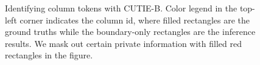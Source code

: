 \documentclass[10pt,twocolumn,letterpaper]{article}
\begin{document}
\begin{figure}
\begin{center}
\end{center}
   \caption{Identifying column tokens with CUTIE-B. Color legend in the top-left corner indicates the column id, where filled rectangles are the ground truths while the boundary-only rectangles are the inference results. We mask out certain private information with filled red rectangles in the figure.}
\label{fig:column}
\end{figure}
\end{document}

